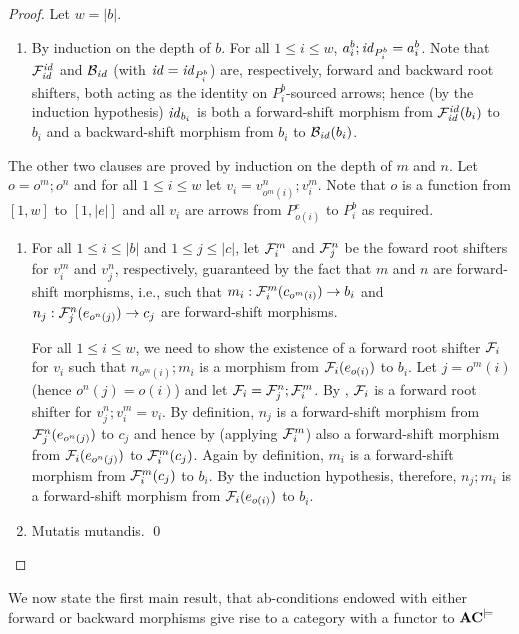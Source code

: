 \begin{fullorname}
\begin{proof}
Let $w=|b|$.
%
\begin{enumerate}[topsep=\smallskipamount]
\item By induction on the depth of $b$. For all $1\leq i\leq w$, $a^b_i;\mathit{id}_{P^b_i}=a^b_i$. Note that $\mathcal{F}^{\mathit{id}}_{\mathit{id}}$ and $\mathcal{B}_{\mathit{id}}$ (with $\mathit{id}=\mathit{id}_{P^b_i}$) are, respectively, forward and backward root shifters, both acting as the identity on $P^b_i$-sourced arrows; hence (by the induction hypothesis) $\mathit{id}_{b_i}$ is both a forward-shift morphism from $\mathcal{F}^{\mathit{id}}_{\mathit{id}}(b_i)$ to $b_i$ and a backward-shift morphism from $b_i$ to $\mathcal{B}_{\mathit{id}}(b_i)$.
\end{enumerate}
%
The other two clauses are proved by induction on the depth of $m$ and $n$. Let $o=o^m;o^n$ and for all $1\leq i\leq w$ let $v_i=v^n_{o^m(i)};v^m_i$. Note that $o$ is a function from $[1,w]$ to $[1,|e|]$ and all $v_i$ are arrows from $P^e_{o(i)}$ to $P^b_i$ as required.
%
\begin{enumerate}[resume]
\item For all $1\leq i\leq |b|$ and $1\leq j\leq |c|$, let $\mathcal{F}^m_i$ and $\mathcal{F}^n_j$ be the foward root shifters for $v^m_i$ and $v^n_j$, respectively, guaranteed by the fact that $m$ and $n$ are forward-shift morphisms, i.e., such that $m_i:\mathcal{F}^m_i(c_{o^m(i)})\rightarrow b_i$ and $n_j:\mathcal{F}^n_j(e_{o^n(j)})\rightarrow c_j$ are forward-shift morphisms.

\smallskip
For all $1\leq i\leq w$, we need to show the existence of a forward root shifter $\mathcal{F}_i$ for $v_i$ such that $n_{o^m(i)};m_i$ is a morphism from $\mathcal{F}_i(e_{o(i)})$ to $b_i$. Let $j=o^m(i)$ (hence $o^n(j)=o(i)$) and let $\mathcal{F}_i=\mathcal{F}^n_j;\mathcal{F}^m_i$. By , $\mathcal{F}_i$ is a forward root shifter for $v^n_j;v^m_i=v_i$. By definition, $n_j$ is a forward-shift morphism from $\mathcal{F}^n_j(e_{o^n(j)})$ to $c_j$ and hence by  (applying $\mathcal{F}^m_i$) also a forward-shift morphism from $\mathcal{F}_i(e_{o^n(j)})$ to $\mathcal{F}^m_i(c_j)$. Again by definition, $m_i$ is a forward-shift morphism from $\mathcal{F}^m_i(c_j)$ to $b_i$. By the induction hypothesis, therefore, $n_j;m_i$ is a forward-shift morphism from $\mathcal{F}_i(e_{o(i)})$ to $b_i$.

\item Mutatis mutandis.
\qed
\end{enumerate}
\end{proof}
\end{fullorname}
%
We now state the first main result, that ab-conditions endowed with either forward or backward morphisms give rise to a category with a functor to $\mathbf{AC}^{\models}$

